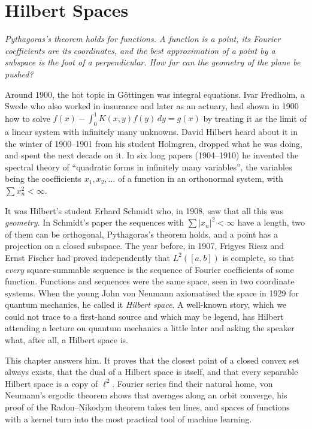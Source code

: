\chapter{Hilbert Spaces}

\begin{center}\itshape
Pythagoras's theorem holds for functions. A function is a point, its Fourier coefficients are its coordinates, and the best
approximation of a point by a subspace is the foot of a perpendicular. How far can the geometry of the plane be pushed?
\end{center}

Around 1900, the hot topic in G\"ottingen was integral equations. Ivar Fredholm, a Swede who also worked in insurance and later as an
actuary, had shown in 1900 how to solve $f(x)-\int_0^1K(x,y)f(y)\,dy=g(x)$ by treating it as the limit of a linear system
with infinitely many unknowns. David Hilbert heard about it in the winter of 1900--1901 from his student Holmgren, dropped what he was
doing, and spent the next decade on it. In six long papers (1904--1910) he invented the spectral theory of ``quadratic forms in
infinitely many variables'', the variables being the coefficients $x_1,x_2,\dots$ of a function in an orthonormal system, with
$\sum x_n^2<\infty$.

It was Hilbert's student Erhard Schmidt who, in 1908, saw that all this was \emph{geometry}. In Schmidt's paper the sequences with
$\sum|x_n|^2<\infty$ have a length, two of them can be orthogonal, Pythagoras's theorem holds, and a point has a projection on a
closed subspace. The year before, in 1907, Frigyes Riesz and Ernst Fischer had proved independently that $L^2([a,b])$ is complete, so that
\emph{every} square-summable sequence is the sequence of Fourier coefficients of some function. Functions and sequences were the same
space, seen in two coordinate systems. When the young John von Neumann axiomatised the space in 1929 for quantum mechanics, he called it
\emph{Hilbert space}. A well-known story, which we could not trace to a first-hand source and which may be legend, has Hilbert attending a lecture
on quantum mechanics a little later and asking the speaker what, after all, a Hilbert space is.

This chapter answers him. It proves that the closest point of a closed convex set always exists, that the dual of a Hilbert space is
itself, and that every separable Hilbert space is a copy of $\ell^2$. Fourier series find their natural home, von Neumann's ergodic
theorem shows that averages along an orbit converge, his proof of the Radon--Nikodym theorem takes ten lines, and spaces of functions
with a kernel turn into the most practical tool of machine learning.

